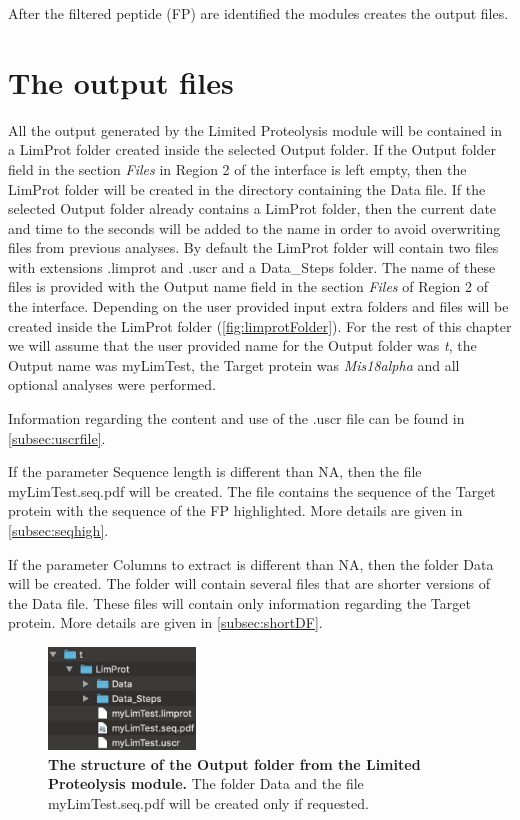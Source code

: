After the filtered peptide (FP) are identified the modules creates the output files.

\section{The output files}

All the output generated by the Limited Proteolysis module will be contained in a LimProt folder created inside the selected Output folder. If the Output folder field in the section \textit{Files} in Region \num{2} of the interface is left empty, then the LimProt folder will be created in the directory containing the Data file. If the selected Output folder already contains a LimProt folder, then the current date and time to the seconds will be added to the name in order to avoid overwriting files from previous analyses. By default the LimProt folder will contain two files with extensions .limprot and .uscr and a Data{\_}Steps folder. The name of these files is provided with the Output name field in the section \textit{Files} of Region \num{2} of the interface. Depending on the user provided input extra folders and files will be created inside the LimProt folder (\autoref{fig:limprotFolder}). For the rest of this chapter we will assume that the user provided name for the Output folder was \textit{t}, the Output name was myLimTest, the Target protein was \textit{Mis18alpha} and all optional analyses were performed.

Information regarding the content and use of the .uscr file can be found in \autoref{subsec:uscrfile}.

If the parameter Sequence length is different than NA, then the file myLimTest.seq.pdf will be created. The file contains the sequence of the Target protein with the sequence of the FP highlighted. More details are given in \autoref{subsec:seqhigh}.

If the parameter Columns to extract is different than NA, then the folder Data will be created. The folder will contain several files that are shorter versions of the Data file. These files will contain only information regarding the Target protein. More details are given in \autoref{subsec:shortDF}.

\begin{figure}[h]
	\centering
	\includegraphics[width=0.35\textwidth]{./IMAGES/MOD-LIMPROT/limprot-files.jpg}	    
	\caption[The structure of the Output folder from the Limited Proteolysis module]{\textbf{The structure of the Output folder from the Limited Proteolysis module.} The folder Data and the file myLimTest.seq.pdf will be created only if requested.} 
	\label{fig:limprotFolder}
	\vspace{-5pt} 	
\end{figure}

